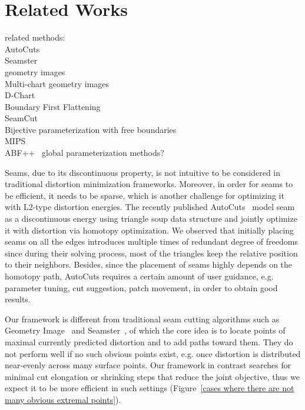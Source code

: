 
\section{Related Works}

related methods:\\
AutoCuts~\cite{Poranne2017Autocuts}\\
Seamster~\cite{Sheffer2002Seamster}\\
geometry images~\cite{Gu2002Geometry}\\
Multi-chart geometry images~\cite{Snyder2003Multi}\\
D-Chart~\cite{Julius2005D}\\
Boundary First Flattening~\cite{Sawhney:2017}\\
SeamCut~\cite{Lucquin:2017}\\
Bijective parameterization with free boundaries~\cite{Smith2015Bijective}\\
MIPS~\cite{Hormann2000MIPS}\\
ABF++~\cite{Sheffer2005ABFPP}
global parameterization methods?

Seams, due to its discontinuous property, is not intuitive to be considered in traditional distortion minimization frameworks. Moreover, in order for seams to be efficient, it needs to be sparse, which is another challenge for optimizing it with L2-type distortion energies. The recently published AutoCuts~\cite{Poranne2017Autocuts} model seam as a discontinuous energy using triangle soup data structure and jointly optimize it with distortion via homotopy optimization. We observed that initially placing seams on all the edges introduces multiple times of redundant degree of freedoms since during their solving process, most of the triangles keep the relative position to their neighbors. Besides, since the placement of seams highly depends on the homotopy path, AutoCuts requires a certain amount of user guidance, e.g. parameter tuning, cut suggestion, patch movement, in order to obtain good results. 

Our framework is different from traditional seam cutting algorithms such as Geometry Image~\cite{Gu2002Geometry} and Seamster~\cite{Sheffer2002Seamster}, of which the core idea is to locate points of maximal currently predicted distortion and to add paths toward them. They do not perform well if no such obvious points exist, e.g. once distortion is distributed near-evenly across many surface points. Our framework in contrast searches for minimal cut elongation or shrinking steps that reduce the joint objective, thus we expect it to be more efficient in such settings (Figure~\ref{cases where there are not many obvious extremal points}).

